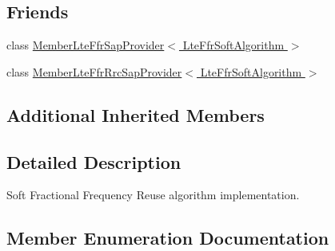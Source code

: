 \subsection*{Friends}
\begin{DoxyCompactItemize}
\item 
class \hyperlink{classns3_1_1LteFfrSoftAlgorithm_aded218523e78168adbc755c40c956146}{Member\+Lte\+Ffr\+Sap\+Provider$<$ Lte\+Ffr\+Soft\+Algorithm $>$}
\item 
class \hyperlink{classns3_1_1LteFfrSoftAlgorithm_a1eb1bcf4d4b431f55c0b6abcd201e9fb}{Member\+Lte\+Ffr\+Rrc\+Sap\+Provider$<$ Lte\+Ffr\+Soft\+Algorithm $>$}
\end{DoxyCompactItemize}
\subsection*{Additional Inherited Members}


\subsection{Detailed Description}
Soft Fractional Frequency Reuse algorithm implementation. 

\subsection{Member Enumeration Documentation}
